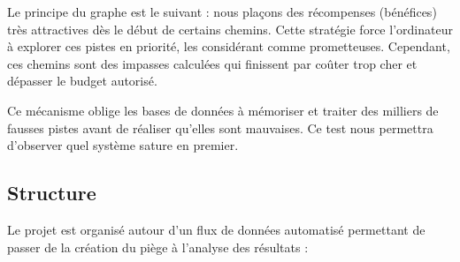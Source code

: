 \documentclass{article}
\begin{document}
    Le principe du graphe est le suivant : nous plaçons des récompenses (bénéfices) très attractives dès le début de certains chemins. Cette stratégie force l'ordinateur à explorer ces pistes en priorité, les considérant comme prometteuses. Cependant, ces chemins sont des impasses calculées qui finissent par coûter trop cher et dépasser le budget autorisé. 


    Ce mécanisme oblige les bases de données à mémoriser et traiter des milliers de fausses pistes avant de réaliser qu'elles sont mauvaises. Ce test nous permettra d'observer quel système sature en premier. \\


    \subsection{Structure}
    Le projet est organisé autour d'un flux de données automatisé permettant de passer de la création du piège à l'analyse des résultats :
\end{document}

